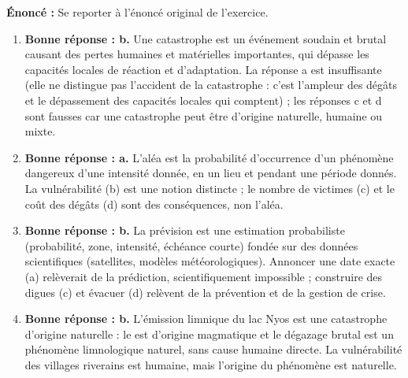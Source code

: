 \documentclass[11pt]{article}
\begin{document}
\begin{corrige}
\textbf{Énoncé :} Se reporter à l'énoncé original de l'exercice.
\tcblower
\begin{enumerate}
\item \textbf{Bonne réponse : b.} Une catastrophe est un événement soudain et brutal causant des pertes humaines et matérielles importantes, qui dépasse les capacités locales de réaction et d'adaptation. La réponse a est insuffisante (elle ne distingue pas l'accident de la catastrophe : c'est l'ampleur des dégâts et le dépassement des capacités locales qui comptent) ; les réponses c et d sont fausses car une catastrophe peut être d'origine naturelle, humaine ou mixte.
\item \textbf{Bonne réponse : a.} L'aléa est la probabilité d'occurrence d'un phénomène dangereux d'une intensité donnée, en un lieu et pendant une période donnés. La vulnérabilité (b) est une notion distincte ; le nombre de victimes (c) et le coût des dégâts (d) sont des conséquences, non l'aléa.
\item \textbf{Bonne réponse : b.} La prévision est une estimation probabiliste (probabilité, zone, intensité, échéance courte) fondée sur des données scientifiques (satellites, modèles météorologiques). Annoncer une date exacte (a) relèverait de la prédiction, scientifiquement impossible ; construire des digues (c) et évacuer (d) relèvent de la prévention et de la gestion de crise.
\item \textbf{Bonne réponse : b.} L'émission limnique du lac Nyos est une catastrophe d'origine naturelle : le  est d'origine magmatique et le dégazage brutal est un phénomène limnologique naturel, sans cause humaine directe. La vulnérabilité des villages riverains est humaine, mais l'origine du phénomène est naturelle.
\end{enumerate}
\end{corrige}
\end{document}
